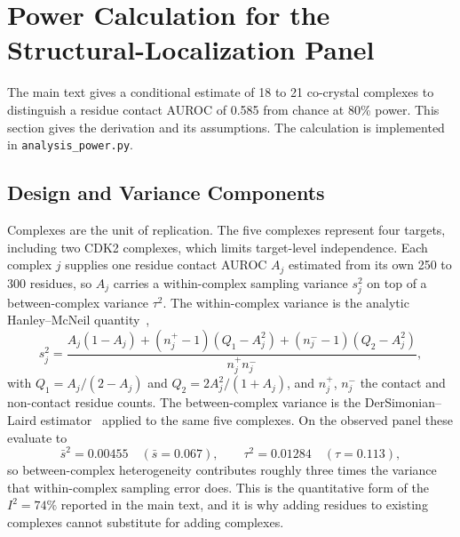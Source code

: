\documentclass[11pt]{article}
\begin{document}
\section{Power Calculation for the Structural-Localization Panel}
The main text gives a conditional estimate of 18 to 21 co-crystal complexes to distinguish a residue contact AUROC of 0.585 from chance at 80\% power. This section gives the derivation and its assumptions. The calculation is implemented in \texttt{analysis\_power.py}.

\subsection{Design and Variance Components}
Complexes are the unit of replication. The five complexes represent four targets, including two CDK2 complexes, which limits target-level independence. Each complex $j$ supplies one residue contact AUROC $A_j$ estimated from its own 250 to 300 residues, so $A_j$ carries a within-complex sampling variance $s_j^2$ on top of a between-complex variance $\tau^2$. The within-complex variance is the analytic Hanley--McNeil quantity~\cite{hanley1982auroc},
\[
s_j^2 = \frac{A_j(1 - A_j) + (n^{+}_j - 1)(Q_1 - A_j^2) + (n^{-}_j - 1)(Q_2 - A_j^2)}{n^{+}_j n^{-}_j},
\]
with $Q_1 = A_j / (2 - A_j)$ and $Q_2 = 2A_j^2 / (1 + A_j)$, and $n^{+}_j$, $n^{-}_j$ the contact and non-contact residue counts. The between-complex variance is the DerSimonian--Laird estimator~\cite{dersimonian1986meta} applied to the same five complexes. On the observed panel these evaluate to
\[
\bar{s}^2 = 0.00455 \quad (\bar{s} = 0.067), \qquad \tau^2 = 0.01284 \quad (\tau = 0.113),
\]
so between-complex heterogeneity contributes roughly three times the variance that within-complex sampling error does. This is the quantitative form of the $I^2 = 74\%$ reported in the main text, and it is why adding residues to existing complexes cannot substitute for adding complexes.
\end{document}

